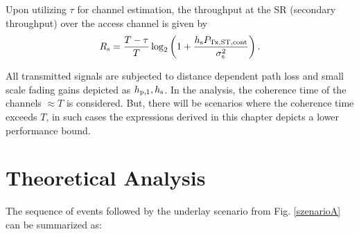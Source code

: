 Upon utilizing $\tau$ for channel estimation, the throughput at the SR (secondary throughput) over the access channel is given by
\begin{equation}
R_{\text{s}} = \frac{T - \tau}{T} \log_2 \left(1 + \frac{h_{\text{s}} P_{\text{Tx,ST,cont}} }{\sigma^2_{\text{s}}} \right). 
\label{eq:sthr}
\end{equation}


All transmitted signals are subjected to distance dependent path loss and small scale fading gains depicted as $h_{\text{p,1}}, h_{\text{s}}$. In the analysis, the coherence time of the channels $\approx T$ is considered. But, there will be scenarios where the coherence time exceeds $T$, in such cases the expressions derived in this chapter depicts a lower performance bound.


\section{Theoretical Analysis}
\label{model}
The sequence of events followed by the underlay scenario from Fig. \ref{szenarioA} can be summarized as:

